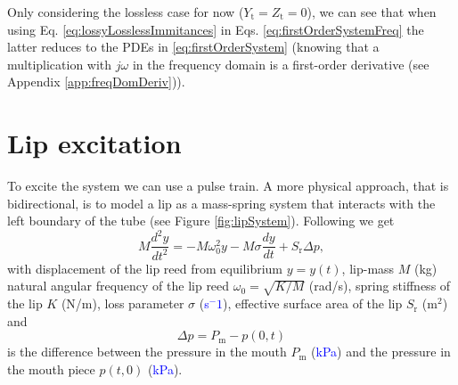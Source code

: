 \documentclass[dvipsnames]{article}
\def\SWcomment[#1]{\textcolor{blue}{#1}}
\begin{document}
Only considering the lossless case for now ($Y_\text{t} = Z_\text{t} = 0$), we can see that when using Eq. \eqref{eq:lossyLosslessImmitances} in Eqs. \eqref{eq:firstOrderSystemFreq} the latter reduces to the PDEs in \eqref{eq:firstOrderSystem} (knowing that a multiplication with $j\omega$ in the frequency domain is a first-order derivative (see Appendix \ref{app:freqDomDeriv})).

\section{Lip excitation}
To excite the system we can use a pulse train. A more physical approach, that is bidirectional, is to model a lip as a mass-spring system that interacts with the left boundary of the tube (see Figure \ref{fig:lipSystem}). Following \cite{Harrison2018} we get
\begin{equation}
    M\frac{d^2y}{dt^2} = -M \omega_0^2 y - M \sigma \frac{dy}{dt} + S_\text{r}\Delta p,
\end{equation}
with displacement of the lip reed from equilibrium $y = y(t)$, lip-mass $M$ (kg) natural angular frequency of the lip reed $\omega_0 = \sqrt{K/M}$ (rad/s), spring stiffness of the lip $K$ (N/m), loss parameter $\sigma$ (\SWcomment[s$^{-1}$]), effective surface area of the lip $S_\text{r}$ (m$^2$) and 
\begin{equation}
    \Delta p = P_\text{m} - p(0,t)
\end{equation}
is the difference between the pressure in the mouth $P_\text{m}$ (\SWcomment[kPa]) and the pressure in the mouth piece $p(t,0)$ (\SWcomment[kPa]). 
\end{document}
